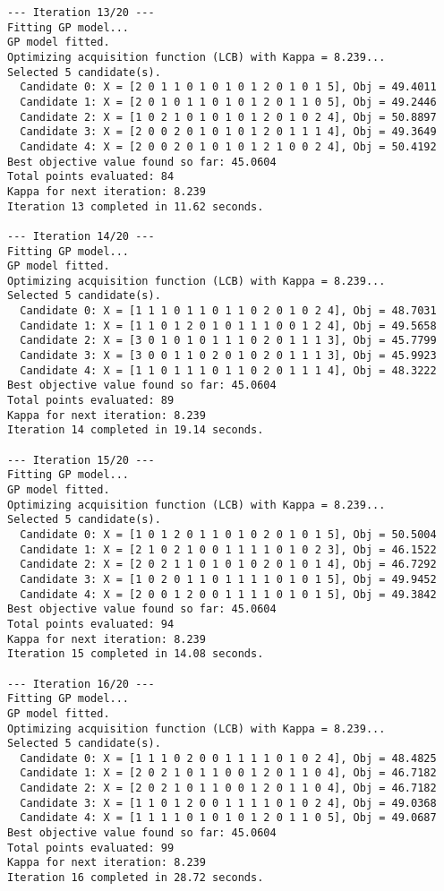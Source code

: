\documentclass[
  letterpaper,
  DIV=11,
  numbers=noendperiod]{scrartcl}
\begin{document}
\begin{verbatim}
--- Iteration 13/20 ---
Fitting GP model...
GP model fitted.
Optimizing acquisition function (LCB) with Kappa = 8.239...
Selected 5 candidate(s).
  Candidate 0: X = [2 0 1 1 0 1 0 1 0 1 2 0 1 0 1 5], Obj = 49.4011
  Candidate 1: X = [2 0 1 0 1 1 0 1 0 1 2 0 1 1 0 5], Obj = 49.2446
  Candidate 2: X = [1 0 2 1 0 1 0 1 0 1 2 0 1 0 2 4], Obj = 50.8897
  Candidate 3: X = [2 0 0 2 0 1 0 1 0 1 2 0 1 1 1 4], Obj = 49.3649
  Candidate 4: X = [2 0 0 2 0 1 0 1 0 1 2 1 0 0 2 4], Obj = 50.4192
Best objective value found so far: 45.0604
Total points evaluated: 84
Kappa for next iteration: 8.239
Iteration 13 completed in 11.62 seconds.

--- Iteration 14/20 ---
Fitting GP model...
GP model fitted.
Optimizing acquisition function (LCB) with Kappa = 8.239...
Selected 5 candidate(s).
  Candidate 0: X = [1 1 1 0 1 1 0 1 1 0 2 0 1 0 2 4], Obj = 48.7031
  Candidate 1: X = [1 1 0 1 2 0 1 0 1 1 1 0 0 1 2 4], Obj = 49.5658
  Candidate 2: X = [3 0 1 0 1 0 1 1 1 0 2 0 1 1 1 3], Obj = 45.7799
  Candidate 3: X = [3 0 0 1 1 0 2 0 1 0 2 0 1 1 1 3], Obj = 45.9923
  Candidate 4: X = [1 1 0 1 1 1 0 1 1 0 2 0 1 1 1 4], Obj = 48.3222
Best objective value found so far: 45.0604
Total points evaluated: 89
Kappa for next iteration: 8.239
Iteration 14 completed in 19.14 seconds.

--- Iteration 15/20 ---
Fitting GP model...
GP model fitted.
Optimizing acquisition function (LCB) with Kappa = 8.239...
Selected 5 candidate(s).
  Candidate 0: X = [1 0 1 2 0 1 1 0 1 0 2 0 1 0 1 5], Obj = 50.5004
  Candidate 1: X = [2 1 0 2 1 0 0 1 1 1 1 0 1 0 2 3], Obj = 46.1522
  Candidate 2: X = [2 0 2 1 1 0 1 0 1 0 2 0 1 0 1 4], Obj = 46.7292
  Candidate 3: X = [1 0 2 0 1 1 0 1 1 1 1 0 1 0 1 5], Obj = 49.9452
  Candidate 4: X = [2 0 0 1 2 0 0 1 1 1 1 0 1 0 1 5], Obj = 49.3842
Best objective value found so far: 45.0604
Total points evaluated: 94
Kappa for next iteration: 8.239
Iteration 15 completed in 14.08 seconds.

--- Iteration 16/20 ---
Fitting GP model...
GP model fitted.
Optimizing acquisition function (LCB) with Kappa = 8.239...
Selected 5 candidate(s).
  Candidate 0: X = [1 1 1 0 2 0 0 1 1 1 1 0 1 0 2 4], Obj = 48.4825
  Candidate 1: X = [2 0 2 1 0 1 1 0 0 1 2 0 1 1 0 4], Obj = 46.7182
  Candidate 2: X = [2 0 2 1 0 1 1 0 0 1 2 0 1 1 0 4], Obj = 46.7182
  Candidate 3: X = [1 1 0 1 2 0 0 1 1 1 1 0 1 0 2 4], Obj = 49.0368
  Candidate 4: X = [1 1 1 1 0 1 0 1 0 1 2 0 1 1 0 5], Obj = 49.0687
Best objective value found so far: 45.0604
Total points evaluated: 99
Kappa for next iteration: 8.239
Iteration 16 completed in 28.72 seconds.


\end{verbatim}
\end{document}
